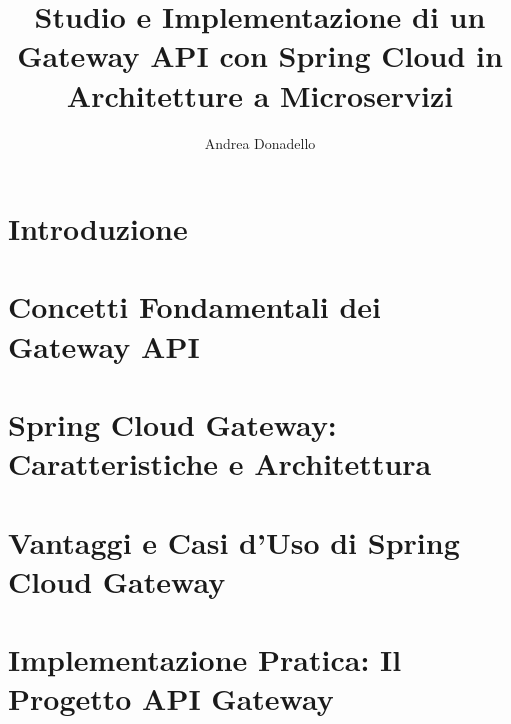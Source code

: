\documentclass[a4paper]{book}
\title{Studio e Implementazione di un Gateway API con Spring Cloud in Architetture a Microservizi}
\author{Andrea Donadello}
\begin{document}
    \maketitle

    

    \tableofcontents

    \chapter{Introduzione}
    

    \chapter[Concetti Fondamentali]{Concetti Fondamentali dei Gateway API}
    

    \chapter[Spring Cloud Gateway]{Spring Cloud Gateway: Caratteristiche e Architettura}
    

    \chapter[Vantaggi e Casi d'Uso]{Vantaggi e Casi d'Uso di Spring Cloud Gateway}
    

    \chapter[Implementazione Pratica]{Implementazione Pratica: Il Progetto API Gateway}
    
\end{document}
